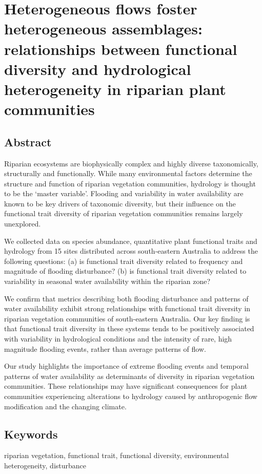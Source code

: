 \documentclass[openright,12pt,a4paper]{memoir}
\begin{document}
\doublespacing


\chapter[functional diversity]{Heterogeneous flows foster heterogeneous assemblages: relationships between functional diversity and hydrological heterogeneity in riparian plant communities}
\newpage

\section*{Abstract}
Riparian ecosystems are biophysically complex and highly diverse taxonomically, structurally and functionally. While many environmental factors determine the structure and function of riparian vegetation communities, hydrology is thought to be the ‘master variable’. Flooding and variability in water availability are known to be key drivers of taxonomic diversity, but their influence on the functional trait diversity of riparian vegetation communities remains largely unexplored.

We collected data on species abundance, quantitative plant functional traits and hydrology from 15 sites distributed across south-eastern Australia to address the following questions: (a) is functional trait diversity related to frequency and magnitude of flooding disturbance? (b) is functional trait diversity related to variability in seasonal water availability within the riparian zone?

We confirm that metrics describing both flooding disturbance and patterns of water availability exhibit strong relationships with functional trait diversity in riparian vegetation communities of south-eastern Australia. Our key finding is that functional trait diversity in these systems tends to be positively associated with variability in hydrological conditions and the intensity of rare, high magnitude flooding events, rather than average patterns of flow.

Our study highlights the importance of extreme flooding events and temporal patterns of water availability as determinants of diversity in riparian vegetation communities. These relationships may have significant consequences for plant communities experiencing alterations to hydrology caused by anthropogenic flow modification and the changing climate. 

\section*{Keywords}
riparian vegetation, functional trait, functional diversity, environmental heterogeneity, disturbance
\end{document}

